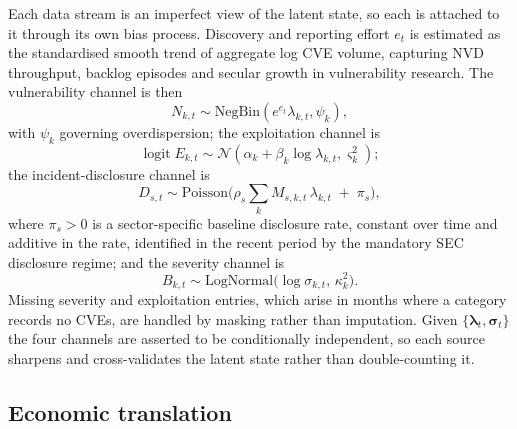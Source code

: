 \documentclass[review]{elsarticle}
\begin{document}
Each data stream is an imperfect view of the latent state, so each is attached to it through its own bias process. Discovery and reporting effort $e_t$ is estimated as the standardised smooth trend of aggregate log CVE volume, capturing NVD throughput, backlog episodes and secular growth in vulnerability research. The vulnerability channel is then
\begin{equation}\label{eq:obs-cve}
    N_{k,t} \sim \text{NegBin}(e^{e_t} \lambda_{k,t}, \psi_k),
\end{equation}
with $\psi_k$ governing overdispersion; the exploitation channel is
\begin{equation}\label{eq:obs-epss}
    \operatorname{logit} E_{k,t} \sim \mathcal{N}(\alpha_k + \beta_k \log \lambda_{k,t}, \varsigma_k^2);
\end{equation}
the incident-disclosure channel is
\begin{equation}\label{eq:obs-8k}
    D_{s,t} \sim \text{Poisson}\Big(\rho_s \textstyle\sum_k M_{s,k,t}\, \lambda_{k,t} \;+\; \pi_s\Big),
\end{equation}
where $\pi_s > 0$ is a sector-specific baseline disclosure rate, constant over time and additive in the rate, identified in the recent period by the mandatory SEC disclosure regime; and the severity channel is
\begin{equation}\label{eq:obs-cvss}
    B_{k,t} \sim \text{LogNormal}\big(\log \sigma_{k,t},\, \kappa_k^2\big).
\end{equation}
Missing severity and exploitation entries, which arise in months where a category records no CVEs, are handled by masking rather than imputation. Given $\{\bm{\lambda}_t, \bm{\sigma}_t\}$ the four channels are asserted to be conditionally independent, so each source sharpens and cross-validates the latent state rather than double-counting it.

\subsection{Economic translation}
\end{document}
